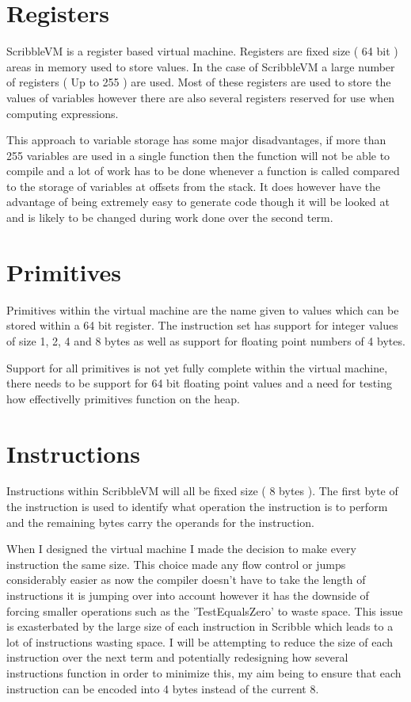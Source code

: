 \documentclass[]{final_report}
\begin{document}
\section{Registers}

ScribbleVM is a register based virtual machine. Registers are fixed size ( 64 bit ) areas in memory used to
store values. In the case of ScribbleVM a large number of registers ( Up to 255 ) are used. Most of these
registers are used to store the values of variables however there are also several registers reserved for use when computing expressions.

This approach to variable storage has some major disadvantages, if more than 255 variables are used in a single function then the function will not be able to compile and a lot of work has to be done whenever a function is called compared to the storage of variables at offsets from the stack. It does however have the advantage of being extremely easy to generate code though it will be looked at and is likely to be changed during work done over the second term.

\section{Primitives}

Primitives within the virtual machine are the name given to values which can be stored within a 64 bit register. The instruction set has support for integer values of size 1, 2, 4 and 8 bytes as well as support for floating point numbers of 4 bytes.

Support for all primitives is not yet fully complete within the virtual machine, there needs to be support for 64 bit floating point values and a need for testing how effectivelly primitives function on the heap.

\section{Instructions}

Instructions within ScribbleVM will all be fixed size ( 8 bytes ). The first byte of the instruction is used to
identify what operation the instruction is to perform and the remaining bytes carry the operands for the instruction.

When I designed the virtual machine I made the decision to make every instruction the same size. This choice made any flow control or jumps considerably easier as now the compiler doesn't have to take the length of instructions it is jumping over into account however it has the downside of forcing smaller operations such as the 'TestEqualsZero' to waste space. This issue is exasterbated by the large size of each instruction in Scribble which leads to a lot of instructions wasting space. I will be attempting to reduce the size of each instruction over the next term and potentially redesigning how several instructions function in order to minimize this, my aim being to ensure that each instruction can be encoded into 4 bytes instead of the current 8.
\end{document}
